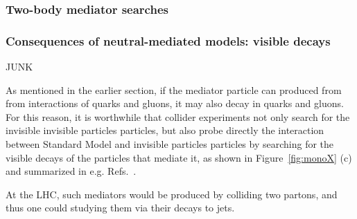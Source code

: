 
\subsubsection{Two-body mediator searches}
\label{sub:twoBody}


\subsubsection{Consequences of neutral-mediated models: visible decays}
\label{sec:MediatorSearches}

JUNK

As mentioned in the earlier section, if the mediator particle can produced from from interactions of
quarks and gluons, it may also decay in quarks and gluons. 
For this reason, it is worthwhile that collider experiments not only search for
the invisible invisible particles particles, but also probe directly the interaction between Standard Model and 
invisible particles particles by searching for the visible decays of the particles that mediate it, as shown 
in Figure~\ref{fig:monoX} (c) and summarized in e.g. Refs.~\cite{Liew:2016oon,Fairbairn:2016iuf}. 


At the LHC, such mediators would be produced by colliding two partons,
and thus one could studying them via their decays to jets. 

